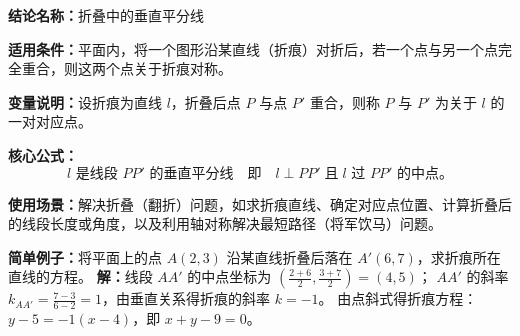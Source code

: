 \textbf{结论名称：}折叠中的垂直平分线

\textbf{适用条件：}平面内，将一个图形沿某直线（折痕）对折后，若一个点与另一个点完全重合，则这两个点关于折痕对称。

\textbf{变量说明：}设折痕为直线 \(l\)，折叠后点 \(P\) 与点 \(P'\) 重合，则称 \(P\) 与 \(P'\) 为关于 \(l\) 的一对对应点。

\textbf{核心公式：}
\[
\boxed{l \text{ 是线段 }PP'\text{ 的垂直平分线}} \quad \text{即} \quad l \perp PP' \;\text{且}\; l \text{ 过 } PP' \text{ 的中点。}
\]

\textbf{使用场景：}解决折叠（翻折）问题，如求折痕直线、确定对应点位置、计算折叠后的线段长度或角度，以及利用轴对称解决最短路径（将军饮马）问题。

\textbf{简单例子：}将平面上的点 \(A(2,3)\) 沿某直线折叠后落在 \(A'(6,7)\)，求折痕所在直线的方程。
\textbf{解：}线段 \(AA'\) 的中点坐标为 \(\left(\frac{2+6}{2},\frac{3+7}{2}\right)=(4,5)\)；
\(AA'\) 的斜率 \(k_{AA'}=\frac{7-3}{6-2}=1\)，由垂直关系得折痕的斜率 \(k=-1\)。
由点斜式得折痕方程：\(y-5 = -1(x-4)\)，即 \(x+y-9=0\)。